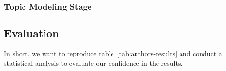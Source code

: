 \documentclass[manuscript]{acmart}
\begin{document}





\subsubsection{Topic Modeling Stage}







\subsection{Evaluation}




In short, we want to reproduce table~\ref{tab:authors-results} and conduct a statistical analysis to evaluate our confidence in the results.
\end{document}
